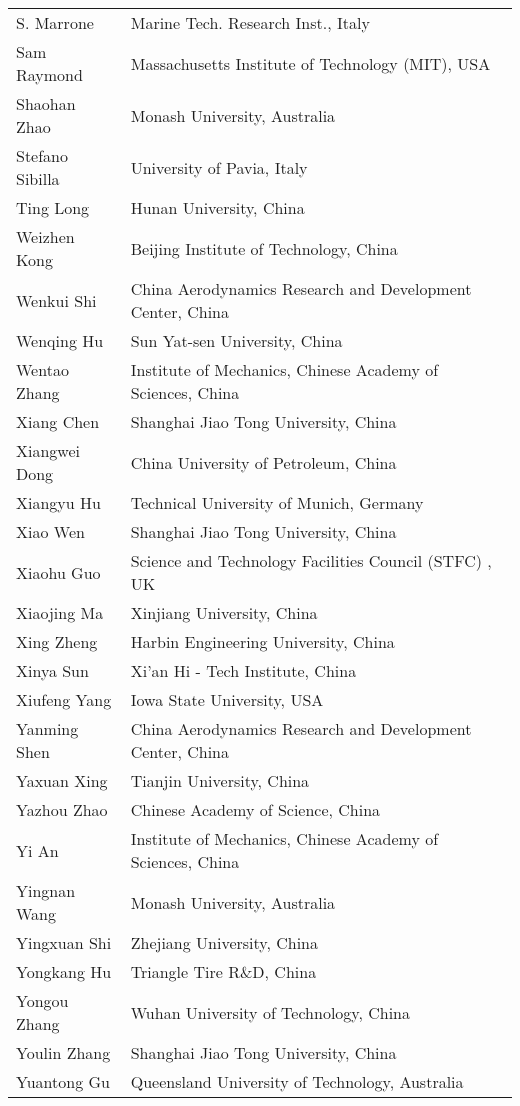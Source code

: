 \begin{longtable}{ll}
S. Marrone&	Marine Tech. Research Inst., Italy\\ 
Sam Raymond&	Massachusetts Institute of Technology (MIT), USA\\ 
Shaohan Zhao&	Monash University, Australia\\ 
Stefano Sibilla&	University of Pavia, Italy\\ 
Ting Long&	Hunan University, China\\ 
Weizhen Kong&	Beijing Institute of Technology, China\\ 
Wenkui Shi&	China Aerodynamics Research and Development Center, China\\ 
Wenqing Hu&	Sun Yat-sen University, China\\ 
Wentao Zhang&	Institute of Mechanics, Chinese Academy of Sciences, China\\ 
Xiang Chen&	Shanghai Jiao Tong University, China\\ 
Xiangwei Dong&	China University of Petroleum, China \\ 
Xiangyu Hu&	Technical University of Munich, Germany\\ 
Xiao Wen&	Shanghai Jiao Tong University, China\\ 
Xiaohu Guo&	Science and Technology Facilities Council (STFC) , UK\\ 
Xiaojing Ma&	Xinjiang University, China\\ 
Xing Zheng&	Harbin Engineering University, China\\ 
Xinya Sun&	Xi'an Hi - Tech Institute, China\\ 
Xiufeng Yang&	Iowa State University, USA\\ 
Yanming Shen&	China Aerodynamics Research and Development Center, China\\ 
Yaxuan Xing&	Tianjin University, China\\ 
Yazhou Zhao&	Chinese Academy of Science, China\\ 
Yi An&	Institute of Mechanics, Chinese Academy of Sciences, China\\ 
Yingnan Wang&	Monash University, Australia\\ 
Yingxuan Shi&	Zhejiang University, China\\ 
Yongkang Hu&	Triangle Tire R\&D, China\\ 
Yongou Zhang&	Wuhan University of Technology, China\\ 
Youlin Zhang&	Shanghai Jiao Tong University, China\\ 
Yuantong Gu&	Queensland University of Technology, Australia\\ 

\end{longtable}
